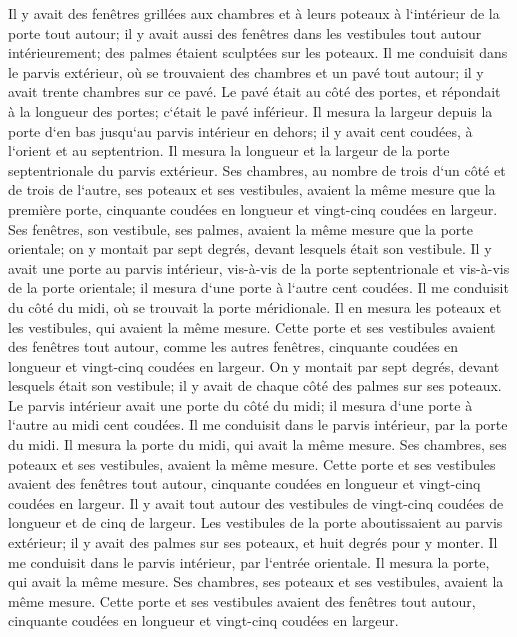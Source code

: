 \verse Il y avait des fenêtres grillées aux chambres et à leurs poteaux à l`intérieur de la porte tout autour; il y avait aussi des fenêtres dans les vestibules tout autour intérieurement; des palmes étaient sculptées sur les poteaux. 
\verse Il me conduisit dans le parvis extérieur, où se trouvaient des chambres et un pavé tout autour; il y avait trente chambres sur ce pavé. 
\verse Le pavé était au côté des portes, et répondait à la longueur des portes; c`était le pavé inférieur. 
\verse Il mesura la largeur depuis la porte d`en bas jusqu`au parvis intérieur en dehors; il y avait cent coudées, à l`orient et au septentrion. 
\verse Il mesura la longueur et la largeur de la porte septentrionale du parvis extérieur. 
\verse Ses chambres, au nombre de trois d`un côté et de trois de l`autre, ses poteaux et ses vestibules, avaient la même mesure que la première porte, cinquante coudées en longueur et vingt-cinq coudées en largeur. 
\verse Ses fenêtres, son vestibule, ses palmes, avaient la même mesure que la porte orientale; on y montait par sept degrés, devant lesquels était son vestibule. 
\verse Il y avait une porte au parvis intérieur, vis-à-vis de la porte septentrionale et vis-à-vis de la porte orientale; il mesura d`une porte à l`autre cent coudées. 
\verse Il me conduisit du côté du midi, où se trouvait la porte méridionale. Il en mesura les poteaux et les vestibules, qui avaient la même mesure. 
\verse Cette porte et ses vestibules avaient des fenêtres tout autour, comme les autres fenêtres, cinquante coudées en longueur et vingt-cinq coudées en largeur. 
\verse On y montait par sept degrés, devant lesquels était son vestibule; il y avait de chaque côté des palmes sur ses poteaux. 
\verse Le parvis intérieur avait une porte du côté du midi; il mesura d`une porte à l`autre au midi cent coudées. 
\verse Il me conduisit dans le parvis intérieur, par la porte du midi. Il mesura la porte du midi, qui avait la même mesure. 
\verse Ses chambres, ses poteaux et ses vestibules, avaient la même mesure. Cette porte et ses vestibules avaient des fenêtres tout autour, cinquante coudées en longueur et vingt-cinq coudées en largeur. 
\verse Il y avait tout autour des vestibules de vingt-cinq coudées de longueur et de cinq de largeur. 
\verse Les vestibules de la porte aboutissaient au parvis extérieur; il y avait des palmes sur ses poteaux, et huit degrés pour y monter. 
\verse Il me conduisit dans le parvis intérieur, par l`entrée orientale. Il mesura la porte, qui avait la même mesure. 
\verse Ses chambres, ses poteaux et ses vestibules, avaient la même mesure. Cette porte et ses vestibules avaient des fenêtres tout autour, cinquante coudées en longueur et vingt-cinq coudées en largeur. 
